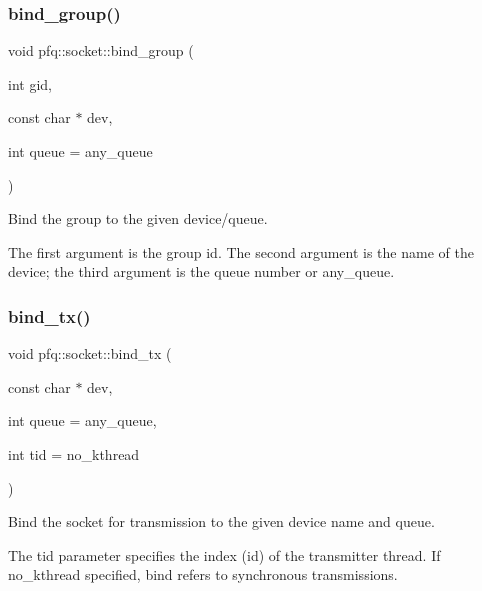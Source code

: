 \subsubsection{\texorpdfstring{bind\+\_\+group()}{bind\_group()}}
{\footnotesize\ttfamily void pfq\+::socket\+::bind\+\_\+group (\begin{DoxyParamCaption}\item[{int}]{gid,  }\item[{const char $\ast$}]{dev,  }\item[{int}]{queue = {\ttfamily any\+\_\+queue} }\end{DoxyParamCaption})\hspace{0.3cm}{\ttfamily [inline]}}



Bind the group to the given device/queue. 

The first argument is the group id. The second argument is the name of the device; the third argument is the queue number or \textquotesingle{}any\+\_\+queue\textquotesingle{}. \mbox{\label{classpfq_1_1socket_a177de236ffec9f988df80b5c1725ba96}} 
\subsubsection{\texorpdfstring{bind\+\_\+tx()}{bind\_tx()}}
{\footnotesize\ttfamily void pfq\+::socket\+::bind\+\_\+tx (\begin{DoxyParamCaption}\item[{const char $\ast$}]{dev,  }\item[{int}]{queue = {\ttfamily any\+\_\+queue},  }\item[{int}]{tid = {\ttfamily no\+\_\+kthread} }\end{DoxyParamCaption})\hspace{0.3cm}{\ttfamily [inline]}}



Bind the socket for transmission to the given device name and queue. 

The tid parameter specifies the index (id) of the transmitter thread. If \textquotesingle{}no\+\_\+kthread\textquotesingle{} specified, bind refers to synchronous transmissions. \mbox{\label{classpfq_1_1socket_ab68dbba5ef01041b9c96758c4a9f0a6c}} 
